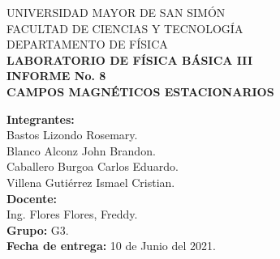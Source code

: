 \documentclass[letter,11pt]{article}
\begin{document}
\begin{titlepage}
\begin{center}
{\Large UNIVERSIDAD MAYOR DE SAN SIMÓN}\\
\vspace*{0.15cm}
{\large FACULTAD DE CIENCIAS Y TECNOLOGÍA}\\
\vspace*{0.10cm}
DEPARTAMENTO DE FÍSICA\\
\vspace*{3.0cm}
{\Large \textbf{LABORATORIO DE FÍSICA BÁSICA III}}\\
\vspace*{0.3cm}
{\Large \textbf{INFORME No. 8}}\\
\vspace*{3.5cm}
{\Large \textbf{CAMPOS MAGNÉTICOS ESTACIONARIOS}}\\
\end{center}

\vspace*{5.8cm}
\leftskip=7.95cm
\noindent
\textbf{Integrantes:}\\
Bastos Lizondo Rosemary.\\
Blanco Alconz John Brandon.\\
Caballero Burgoa Carlos Eduardo.\\
Villena Gutiérrez Ismael Cristian.\\
\newline
\textbf{Docente:}\\
Ing. Flores Flores, Freddy.\\
\newline
\textbf{Grupo:} G3.\\
\textbf{Fecha de entrega:} 10 de Junio del 2021.\\

\end{titlepage}
\end{document}
